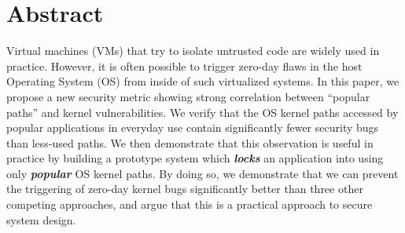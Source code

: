 \section*{Abstract}

%
%

%
%

Virtual machines (VMs) that try to isolate untrusted code are widely used in practice.
However, it is often possible to trigger zero-day flaws
in the host Operating System (OS) from inside of such virtualized systems.
%
In this paper, we propose a new security metric showing strong correlation
between ``popular paths''
and kernel vulnerabilities. We verify that the OS kernel paths accessed
by popular applications in everyday use contain significantly fewer security
bugs than less-used paths.  We then demonstrate that this observation is
useful in practice by building a prototype system which \textbf{\textit{locks}}
an application into using only \textbf{\textit{popular}} OS kernel paths.
By doing so, we demonstrate that we can prevent the triggering of zero-day
kernel bugs significantly better than three other competing approaches, and
argue that this is a practical approach to  secure system design.

